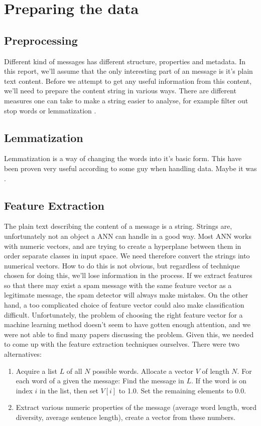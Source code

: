 
\section{Preparing the data}

\subsection{Preprocessing}

Different kind of messages has different structure, properties and
metadata. In this report, we'll assume that the only interesting part of an
message is it's plain text content. Before we attempt to get any useful
information from this content, we'll
need to prepare the content string in various ways. There are different
measures one can take to make a string easier to analyse, for example filter
out stop words \cite{stop-words} or lemmatization \cite{lemmatization}.

\subsection{Lemmatization} Lemmatization is a way of changing the words into
it's basic form. This have been proven very useful according to some guy when
handling data. Maybe it was
\cite{tretyakov2004machine}.

\subsection{Feature Extraction}

The plain text describing the content of a message is a string.
Strings are, unfortunately not an object a ANN can handle in a good
way. Most ANN works with numeric vectors, and are trying to create a hyperplane
between them in order separate classes in input space. We need therefore
convert the strings into numerical vectors. How to do this is not obvious,
but regardless of technique chosen for doing this, we'll lose
information in the process. If we extract features so that there may exist a
spam message with the same feature vector as a legitimate message, the spam
detector will always make mistakes. On the other hand, a too complicated choice
of feature vector could also make classification difficult. Unfortunately, the
problem of choosing the right feature vector for a machine learning method
doesn't seem to have gotten enough attention, and we were not able to find many
papers discussing the problem. Given this, we needed to come up with the
feature extraction techniques ourselves. There were two alternatives:
\begin{enumerate}
  \item Acquire a list $L$ of all $N$ possible words. Allocate a vector $V$
    of length $N$. For each word of a given the message: Find the message in
    $L$.  If the word is on index $i$ in the list, then set $V[i]$ to 1.0. Set
    the remaining elements to 0.0.
  \item Extract various numeric properties of the message (average word length,
    word diversity, average sentence length), create a vector from these
    numbers.
\end{enumerate}

